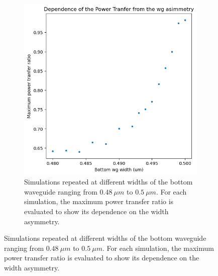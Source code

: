 \begin{figure}[H]
\begin{subfigure}[b]{0.48\linewidth}
        \includegraphics[width=\linewidth]{Figures/wg_power_vs_asymm.png}
        \caption{Simulations repeated at different widths of the bottom waveguide ranging from \(0.48\ \mu m\) to \(0.5\ \mu m\). For each simulation, the maximum power transfer ratio is evaluated to show its dependence on the width asymmetry.}
        \label{fig:wg_power_vs_asymm}
    \end{subfigure}
\end{figure}